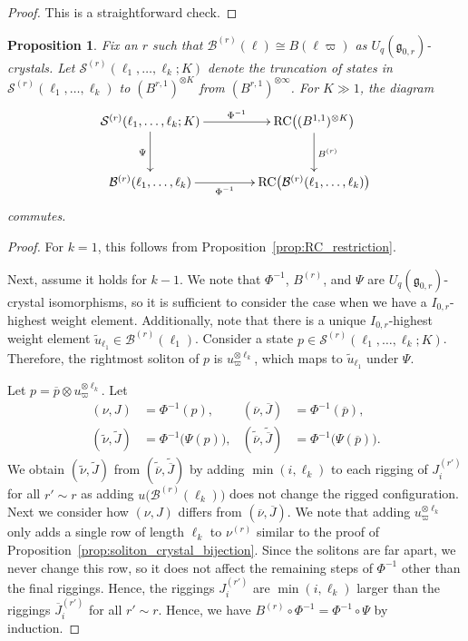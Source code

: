 \documentclass[reqno]{amsart}
\newcommand{\g}{\mathfrak{g}}
\newcommand{\iso}{\cong}
\newcommand{\Sol}{\mathcal{S}} %
\DeclareMathOperator{\RC}{RC} %
\theoremstyle{plain}
\newtheorem{prop}[thm]{Proposition}
\theoremstyle{definition}
\numberwithin{equation}{section}
\begin{document}
\begin{proof}
This is a straightforward check.
\end{proof}

\begin{prop}
\label{prop:sides_commute}
Fix an $r$ such that $\mathcal{B}^{(r)}(\ell) \iso B(\ell\varpi)$ as $U_q(\g_{0,r})$-crystals.
Let $\Sol^{(r)}(\ell_1, \dotsc, \ell_k; K)$ denote the truncation of states in $\Sol^{(r)}(\ell_1, \dotsc, \ell_k)$ to $(B^{r,1})^{\otimes K}$ from $(B^{r,1})^{\otimes \infty}$.
For $K \gg 1$, the diagram
\[
\xymatrixcolsep{4em}
\xymatrixrowsep{3em}
\xymatrix{
\Sol^{(r)}(\ell_1, \dotsc, \ell_k; K) \ar[d]_{\Psi} \ar[r]^-{\Phi^{-1}} & \RC\bigl( (B^{1,1})^{\otimes K} \bigr) \ar[d]^{B^{(r)}}
\\ \mathcal{B}^{(r)}(\ell_1, \dotsc, \ell_k) \ar[r]_-{\Phi^{-1}} & \RC\bigl( \mathcal{B}^{(r)}(\ell_1, \dotsc, \ell_k) \bigr)
}
\]
commutes.
\end{prop}

\begin{proof}
For $k = 1$, this follows from Proposition~\ref{prop:RC_restriction}.

Next, assume it holds for $k-1$.
We note that $\Phi^{-1}$, $B^{(r)}$, and $\Psi$ are $U_q(\g_{0,r})$-crystal isomorphisms, so it is sufficient to consider the case when we have a $I_{0,r}$-highest weight element.
Additionally, note that there is a unique $I_{0,r}$-highest weight element $\widetilde{u}_{\ell_1} \in \mathcal{B}^{(r)}(\ell_1)$.
Consider a state $p \in \Sol^{(r)}(\ell_1, \dotsc, \ell_k; K)$.
Therefore, the rightmost soliton of $p$ is $u_{\varpi}^{\otimes \ell_k}$, which maps to $\widetilde{u}_{\ell_1}$ under $\Psi$.

Let $p = \overline{p} \otimes u_{\varpi}^{\otimes \ell_k}$.
Let
\begin{align*}
(\nu, J) & = \Phi^{-1}(p), & (\overline{\nu}, \overline{J}) & = \Phi^{-1}(\overline{p}),
\\ (\widetilde{\nu}, \widetilde{J}) & = \Phi^{-1}\bigl( \Psi(p) \bigr), & (\widetilde{\overline{\nu}}, \widetilde{\overline{J}}) & = \Phi^{-1}\bigl( \Psi(\overline{p}) \bigr).
\end{align*}
We obtain $(\widetilde{\nu}, \widetilde{J})$ from $(\widetilde{\overline{\nu}}, \widetilde{\overline{J}})$ by adding $\min(i, \ell_k)$ to each rigging of $J_i^{(r')}$ for all $r' \sim r$ as adding $u\bigl(\mathcal{B}^{(r)}(\ell_k)\bigr)$ does not change the rigged configuration.
Next we consider how $(\nu, J)$ differs from $(\overline{\nu}, \overline{J})$.
We note that adding $u_{\varpi}^{\otimes \ell_k}$ only adds a single row of length $\ell_k$ to $\nu^{(r)}$ similar to the proof of Proposition~\ref{prop:soliton_crystal_bijection}.
Since the solitons are far apart, we never change this row, so it does not affect the remaining steps of $\Phi^{-1}$ other than the final riggings.
Hence, the riggings $J_i^{(r')}$ are $\min(i, \ell_k)$ larger than the riggings $\overline{J}_i^{(r')}$ for all $r' \sim r$.
Hence, we have $B^{(r)} \circ \Phi^{-1} = \Phi^{-1} \circ \Psi$ by induction.
\end{proof}
\end{document}
